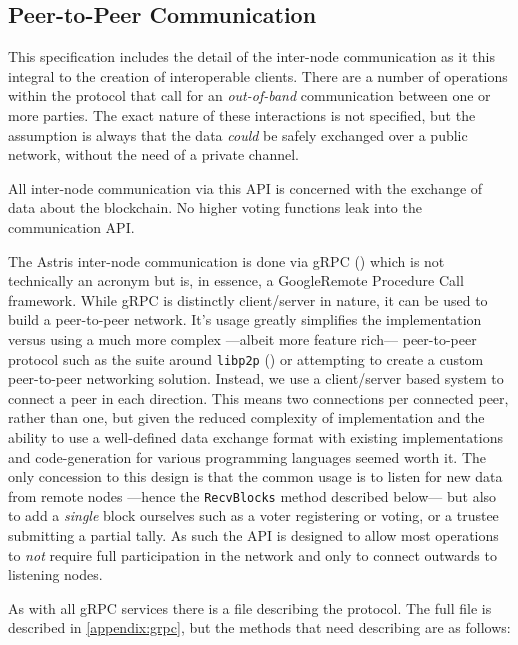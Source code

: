 \subsection{Peer-to-Peer Communication}
\label{ch:astris:detail:p2p}

This specification includes the detail of the inter-node communication as it this integral to the creation of interoperable clients. There are a number of operations within the protocol that call for an \emph{out-of-band} communication between one or more parties. The exact nature of these interactions is not specified, but the assumption is always that the data \emph{could} be safely exchanged over a public network, without the need of a private channel.

All inter-node communication via this API is concerned with the exchange of data about the blockchain. No higher voting functions leak into the communication API.

The Astris inter-node communication is done via gRPC () which is not technically an acronym but is, in essence, a Google\texttrademark Remote Procedure Call framework. While gRPC is distinctly client/server in nature, it can be used to build a peer-to-peer network. It's usage greatly simplifies the implementation versus using a much more complex ---albeit more feature rich--- peer-to-peer protocol such as the suite around \texttt{libp2p} () or attempting to create a custom peer-to-peer networking solution. Instead, we use a client/server based system to connect a peer in each direction. This means two connections per connected peer, rather than one, but given the reduced complexity of implementation and the ability to use a well-defined data exchange format with existing implementations and code-generation for various programming languages seemed worth it. The only concession to this design is that the common usage is to listen for new data from remote nodes ---hence the \texttt{RecvBlocks} method described below--- but also to add a \emph{single} block ourselves such as a voter registering or voting, or a trustee submitting a partial tally. As such the API is designed to allow most operations to \emph{not} require full participation in the network and only to connect outwards to listening nodes.

As with all gRPC services there is a file describing the protocol. The full file is described in \autoref{appendix:grpc}, but the methods that need describing are as follows:

